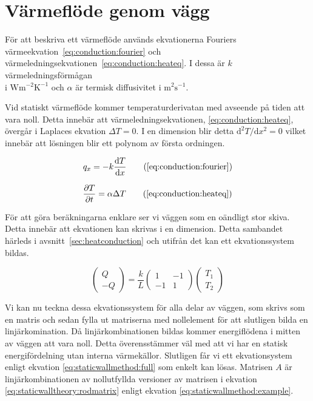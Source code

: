\section{Värmeflöde genom vägg}

För att beskriva ett värmeflöde används ekvationerna Fouriers värmeekvation~\eqref{eq:conduction:fourier} och värmeledningsekvationen~\eqref{eq:conduction:heateq}. 
I dessa är
$k$ värmeledningsförmågan\\i $\mbox{W}\mbox{m}^{-2}\mbox{K}^{-1}$ och
$\alpha$ är termisk diffusivitet i $\mbox{m}^2\mbox{s}^{-1}$. \cite{physicshandbook}

Vid statiskt värmeflöde kommer temperaturderivatan med avseende på tiden att vara noll. Detta innebär att värmeledningsekvationen, \eqref{eq:conduction:heateq}, övergår i Laplaces ekvation $\Delta T = 0$. I en dimension blir detta $\mathrm{d}
^2T/\mathrm{d} x^2 = 0$ vilket innebär att lösningen blir ett polynom av första ordningen. 

\begin{equation}
q_x = -k \frac{\mathrm{d}T}{\mathrm{d}x}
\tag{\ref{eq:conduction:fourier}}
\end{equation}

\begin{equation}
\frac{\partial T}{\partial t} = \alpha \Delta T
\tag{\ref{eq:conduction:heateq}}
\end{equation}

\noindent
För att göra beräkningarna enklare ser vi väggen som en oändligt stor skiva. Detta innebär att ekvationen kan skrivas i en dimension. Detta sambandet härleds i avsnitt~\ref{sec:heatconduction} och utifrån det kan ett ekvationssystem bildas.

\begin{equation}
\label{eq:staticwalltheory:rodmatrix}
\begin{pmatrix}
Q \\
-Q
\end{pmatrix} = 
\frac{k}{L}\begin{pmatrix}
1 & -1 \\
-1 & 1
\end{pmatrix}
\begin{pmatrix}
T_1 \\
T_2
\end{pmatrix}
\end{equation}

\noindent
Vi kan nu teckna dessa ekvationssystem för alla delar av väggen, som skrivs som 
en matris och sedan fylla ut matriserna med nollelement för att slutligen bilda 
en linjärkomination.
Då linjärkombinationen bildas kommer energiflödena i mitten av väggen att
vara noll. Detta överensstämmer väl med att vi har en statisk energifördelning
utan interna värmekällor.
Slutligen får vi ett ekvationsystem enligt ekvation
\eqref{eq:staticwallmethod:full} som enkelt kan lösas.
Matrisen $A$ är linjärkombinationen av nollutfyllda versioner av matrisen i ekvation
\eqref{eq:staticwalltheory:rodmatrix} enligt ekvation
\eqref{eq:staticwallmethod:example}.

